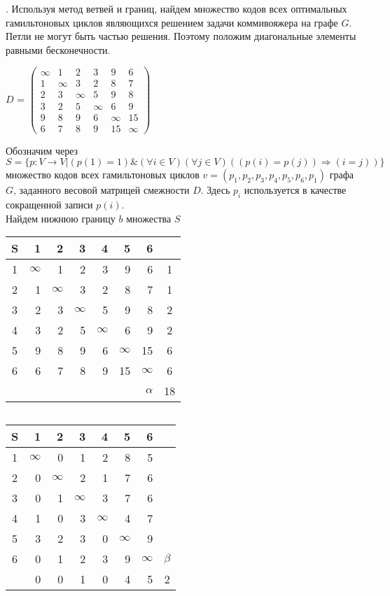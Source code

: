 \documentclass[12pt]{article}
\begin{document}
	\vspace{5mm}
	. Используя метод ветвей и границ, найдем множество кодов всех оптимальных гамильтоновых циклов являющихся решением задачи коммивояжера на графе $G$.\\
	Петли не могут быть частью решения. Поэтому положим диагональные элементы равными бесконечности.\\

\begin{flushleft}
$D$ =
$
\begin{pmatrix}
 \infty & 1 & 2 & 3 & 9 & 6 \\
1 &  \infty & 3 & 2 & 8 & 7 \\
2 & 3 &  \infty & 5 & 9 & 8 \\
3 & 2 & 5 &  \infty & 6 & 9 \\
9 & 8 & 9 & 6 &  \infty & 15 \\
6 & 7 & 8 & 9 & 15 &  \infty 
\end{pmatrix}
$
\end{flushleft}

	
	Обозначим через
	$S = \{p:V \rightarrow V | (p(1) = 1) \&
	(\forall i \in V)(\forall j \in V)
	((p(i) = p(j)) \Rightarrow (i = j))\}$
	множество кодов всех гамильтоновых циклов
	$v = (p_1, p_2, p_3, p_4, p_5, p_6, p_1)$
	графа $G$, заданного весовой матрицей
	смежности $D$. Здесь $p_i$ используется
	в качестве сокращенной записи $p(i)$.\\
	Найдем нижнюю границу $b$ множества $S$\\



\begin{flushleft}
\begin{tabular}{c||rrrrrr||c}
S & 1 & 2 & 3 & 4 & 5 & 6 & \\
\hline
\hline
1 & $\infty$ & 1 & 2 & 3 & 9 & 6 & 1\\
2 & 1 & $\infty$ & 3 & 2 & 8 & 7 & 1\\
3 & 2 & 3 & $\infty$ & 5 & 9 & 8 & 2\\
4 & 3 & 2 & 5 & $\infty$ & 6 & 9 & 2\\
5 & 9 & 8 & 9 & 6 & $\infty$ & 15 & 6\\
6 & 6 & 7 & 8 & 9 & 15 & $\infty$ & 6\\
\hline
\hline
 &  &  &  &  & & $\alpha$ & 18\\
\end{tabular}
$\qquad $  
\begin{tabular}{c||rrrrrr||c}
S & 1 & 2 & 3 & 4 & 5 & 6 & \\
\hline
\hline
1 & $\infty$ & 0 & 1 & 2 & 8 & 5 & \\
2 & 0 & $\infty$ & 2 & 1 & 7 & 6 & \\
3 & 0 & 1 & $\infty$ & 3 & 7 & 6 & \\
4 & 1 & 0 & 3 & $\infty$ & 4 & 7 & \\
5 & 3 & 2 & 3 & 0 & $\infty$ & 9 & \\
6 & 0 & 1 & 2 & 3 & 9 & $\infty$ & $\beta$ \\
\hline
\hline
 & 0 & 0 & 1 & 0 & 4 & 5 & 2\\
\end{tabular}
\end{flushleft}
\end{document}
